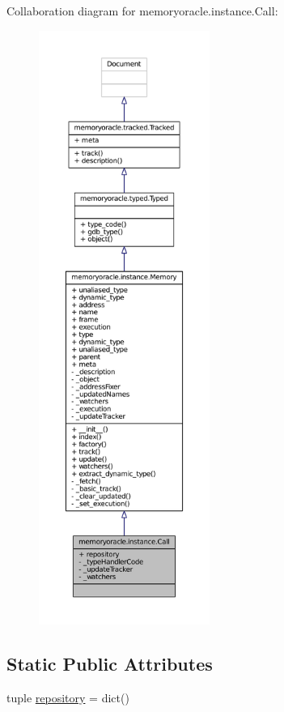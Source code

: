 Collaboration diagram for memoryoracle.\+instance.\+Call\+:
\nopagebreak
\begin{figure}[H]
\begin{center}
\leavevmode
\includegraphics[height=550pt]{classmemoryoracle_1_1instance_1_1Call__coll__graph}
\end{center}
\end{figure}
\subsection*{Static Public Attributes}
\begin{DoxyCompactItemize}
\item 
tuple \hyperlink{classmemoryoracle_1_1instance_1_1Call_a8dc27177c9f423bd7127478c9865208a}{repository} = dict()
\end{DoxyCompactItemize}

